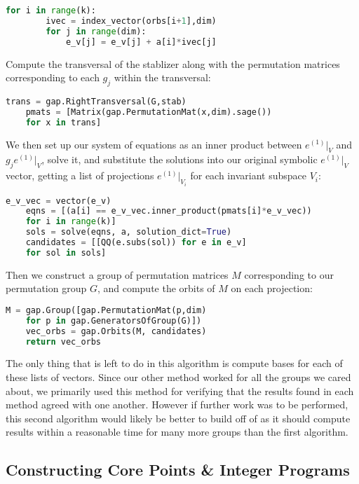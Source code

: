 \documentclass[11pt]{article} %
\theoremstyle{definition}
\theoremstyle{remark}
\begin{document}
\begin{lstlisting}[language=Python, frame=single]
    for i in range(k):
        ivec = index_vector(orbs[i+1],dim)
        for j in range(dim):
            e_v[j] = e_v[j] + a[i]*ivec[j]
\end{lstlisting}

Compute the transversal of the stablizer along with the permutation matrices corresponding to each $g_j$ within the transversal:

\begin{lstlisting}[language=Python, frame=single]
    trans = gap.RightTransversal(G,stab)
    pmats = [Matrix(gap.PermutationMat(x,dim).sage()) 
	for x in trans]
\end{lstlisting}

We then set up our system of equations as an inner product between $e^{(1)}|_V$ and $g_j e^{(1)}|_V$, solve it, and substitute the solutions into our original symbolic $e^{(1)}|_V$ vector, getting a list of projections $e^{(1)}|_{V_i}$ for each invariant subspace $V_i$:

\begin{lstlisting}[language=Python, frame=single]
    e_v_vec = vector(e_v)
    eqns = [(a[i] == e_v_vec.inner_product(pmats[i]*e_v_vec)) 
	for i in range(k)]
    sols = solve(eqns, a, solution_dict=True)
    candidates = [[QQ(e.subs(sol)) for e in e_v] 
	for sol in sols]
\end{lstlisting}

Then we construct a group of permutation matrices $M$ corresponding to our permutation group $G$, and compute the orbits of $M$ on each projection:

\begin{lstlisting}[language=Python, frame=single]
    M = gap.Group([gap.PermutationMat(p,dim) 
	for p in gap.GeneratorsOfGroup(G)])
    vec_orbs = gap.Orbits(M, candidates)
    return vec_orbs
\end{lstlisting}

The only thing that is left to do in this algorithm is compute bases for each of these lists of vectors. Since our other method worked for all the groups we cared about, we primarily used this method for verifying that the results found in each method agreed with one another. However if further work was to be performed, this second algorithm would likely be better to build off of as it should compute results within a reasonable time for many more groups than the first algorithm.

\subsection{Constructing Core Points \& Integer Programs}
\end{document}

